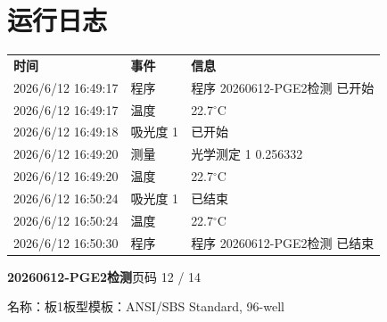 \documentclass[UTF8,10pt,a4paper,fontset=fandol]{ctexart}
\begin{document}
\section*{运行日志}

\begin{tabular}{@{}p{3.7cm}p{3.2cm}p{6.2cm}@{}}
\textbf{时间} & \textbf{事件} & \textbf{信息}\\
2026/6/12 16:49:17 & 程序 & 程序 20260612-PGE2检测 已开始\\
2026/6/12 16:49:17 & 温度 & 22.7$^\circ$C\\
2026/6/12 16:49:18 & 吸光度 1 & 已开始\\
2026/6/12 16:49:20 & 测量 & 光学测定 1 0.256332\\
2026/6/12 16:49:20 & 温度 & 22.7$^\circ$C\\
2026/6/12 16:50:24 & 吸光度 1 & 已结束\\
2026/6/12 16:50:24 & 温度 & 22.7$^\circ$C\\
2026/6/12 16:50:30 & 程序 & 程序 20260612-PGE2检测 已结束\\
\end{tabular}

\newpage

\noindent\textbf{20260612-PGE2检测}\hfill 页码 12 / 14

\medskip
\noindent
名称：板1\hfill 板型模板：ANSI/SBS Standard, 96-well
\end{document}
